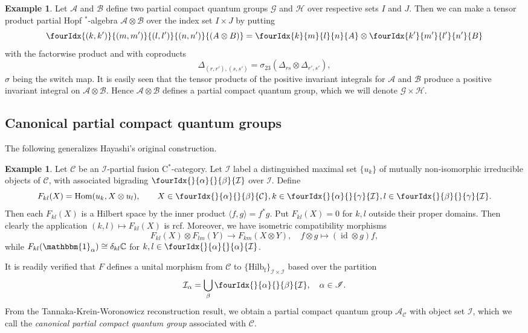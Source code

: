 \documentclass[10pt]{article}
\DeclareMathOperator{\fin}{\mathrm{f}}
\DeclareMathOperator{\id}{id}
\DeclareMathOperator{\Hom}{Hom}
\newcommand{\C}{\mathbb{C}}
\newcommand{\CatC}{\mathcal{C}}
\newcommand{\CatCC}{\mathscr{C}}
\newcommand{\Hilb}{\mathrm{Hilb}}
\newcommand{\Unitb}{\mathbbm{1}}
\newcommand{\Gr}[5]{\fourIdx{#2}{#4}{#3}{#5}{#1}}%
\newcommand{\Gru}[3]{\Gr{#1}{}{}{#2}{#3}}
\theoremstyle{definition}
\newtheorem{Exa}[Theorem]{Example}
\numberwithin{equation}{section}
\begin{document}
\begin{Exa} Let $\mathscr{A}$ and $\mathscr{B}$ define two partial compact quantum groups $\mathscr{G}$ and $\mathscr{H}$ over respective sets $I$ and $J$. Then we can make a tensor product partial Hopf $^*$-algebra $\mathscr{A}\otimes \mathscr{B}$ over the index set $I\times J$ by putting \[\Gr{(A\otimes B)}{(k,k')}{(l,l')}{(m,m')}{(n,n')} = \Gr{A}{k}{l}{m}{n}\otimes \Gr{B}{k'}{l'}{m'}{n'}\] with the factorwise product and with coproducts \[\Delta_{(r,r'),(s,s')} = \sigma_{23}(\Delta_{rs}\otimes \Delta_{r',s'}),\] $\sigma$ being the switch map. It is easily seen that the tensor products of the positive invariant integrals for $\mathscr{A}$ and $\mathscr{B}$ produce a positive invariant integral on $\mathscr{A}\otimes \mathscr{B}$. Hence $\mathscr{A}\otimes \mathscr{B}$ defines a partial compact quantum group, which we will denote $\mathscr{G}\times \mathscr{H}$.
\end{Exa}

\subsection{Canonical partial compact quantum groups} \label{SubSecCan}

The following generalizes Hayashi's original construction.

\begin{Exa} 
Let $\CatCC$ be an $\mathscr{I}$-partial fusion C$^*$-category. Let $\mathcal{I}$ label a distinguished maximal set $\{u_k\}$ of mutually non-isomorphic irreducible objects of $\CatC$, with associated bigrading $\Gru{\mathcal{I}}{\alpha}{\beta}$ over $\mathscr{I}$. Define \[F_{kl}(X)  = \Hom(u_k,  X\otimes u_l),\qquad X\in \Gru{\CatC}{\alpha}{\beta}, k\in \Gru{\mathcal{I}}{\alpha}{\gamma},l\in \Gru{\mathcal{I}}{\beta}{\gamma}.\] Then each $F_{kl}(X)$ is a Hilbert space by the inner product $\langle f,g\rangle = f^*g$. Put $F_{kl}(X) = 0$ for $k,l$ outside their proper domains. Then clearly the application $(k,l)\mapsto F_{kl}(X)$ is rcf. Moreover, we have isometric compatibility morphisms \[F_{kl}(X)\otimes F_{lm}(Y)\rightarrow F_{km}(X\otimes Y),\quad f\otimes g \mapsto (\id\otimes g)f,\] while $F_{kl}(\Unitb_{\alpha}) \cong \delta_{kl} \C$ for $k,l\in \Gru{\mathcal{I}}{\alpha}{\alpha}$. 

It is readily verified that $F$ defines a unital morphism from $\CatCC$ to $\{\Hilb_{\fin}\}_{\mathcal{I}\times \mathcal{I}}$ based over the partition \[\mathcal{I}_{\alpha} = \bigcup_{\beta} \Gru{\mathcal{I}}{\alpha}{\beta},\quad\alpha\in \mathscr{I}.\] From the Tannaka-Krein-Woronowicz reconstruction result, we obtain a partial compact quantum group $\mathscr{A}_{\CatCC}$ with object set $\mathcal{I}$, which we call the \emph{canonical partial compact quantum group} associated with $\CatCC$. 
\end{Exa} 
\end{document}
